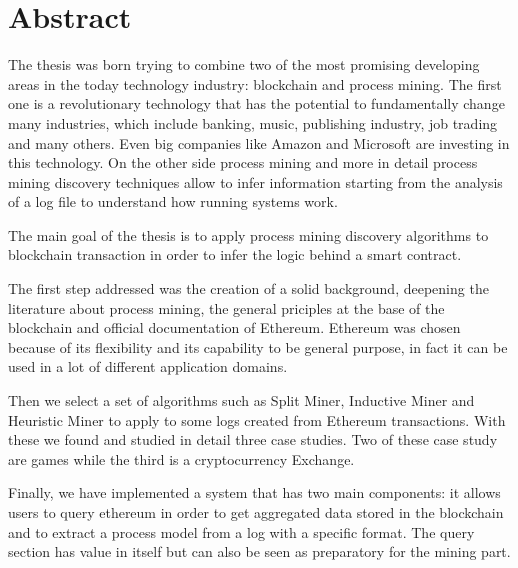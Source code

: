 
\chapter*{Abstract}

The thesis was born trying to combine two of the most promising developing areas in the today technology industry: blockchain and 
process mining. The first one is a revolutionary technology that has the potential to fundamentally change many industries, 
which include banking, music, publishing industry, job trading and many others. Even big companies like Amazon and Microsoft 
are investing in this technology. On the other side process mining and more in detail process mining discovery 
techniques allow to infer information starting from the analysis of a log file to understand how running systems work.

The main goal of the thesis is to apply process mining discovery algorithms to blockchain transaction in order to infer the 
logic behind a smart contract.

The first step addressed was the creation of a solid background, deepening the literature about process mining, the general 
priciples at the base of the blockchain and official documentation of Ethereum. Ethereum was chosen 
because of its flexibility and its capability to be general purpose, in fact it can be used in a lot of different application 
domains.

Then we select a set of algorithms such as Split Miner, Inductive Miner and Heuristic Miner to apply to some logs created from 
Ethereum transactions. With these we found and studied in detail three case studies. Two of these case study are games while the 
third is a cryptocurrency Exchange. 

Finally, we have implemented a system that has two main components: it allows users to query ethereum in order to get aggregated 
data stored in the blockchain and to extract a process model from a log with a specific format. The query section has value in 
itself but can also be seen as preparatory for the mining part.